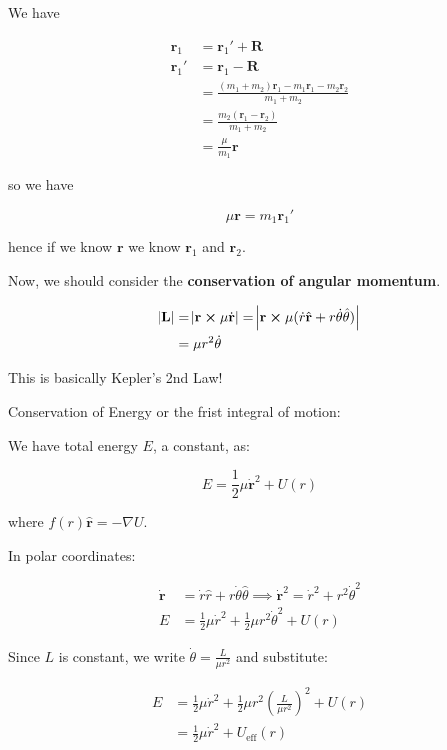 We have

\begin{align}
	\mathbf{r}_1 &= \mathbf{r}_1' + \mathbf{R}\\
	\textbf{r}_1' &= \textbf{r}_1 - \mathbf{R}\\
	&= \frac{(m_1 + m_2) \mathbf{r}_1 - m_1 \mathbf{r}_1 - m_2 \mathbf{r}_2}{m_1 + m_2}\\
	&= \frac{m_2 (\mathbf{r}_1 - \mathbf{r}_2)}{m_1 + m_2}\\
	&= \frac{\mu}{m_1} \mathbf{r}
\end{align}

so we have

\begin{equation}
	\mu \mathbf{r} = m_1 \mathbf{r}_1'
\end{equation}

hence if we know $\mathbf{r}$ we know $\mathbf{r}_1$ and $\mathbf{r}_2$.

Now, we should consider the \textbf{conservation of angular momentum}.

\begin{align}
	\abs{\mathbf{L}} &= \abs{\mathbf{r} \cross \mu \dot{\mathbf{r}}} = \abs{\mathbf{r} \cross \mu (\dot r \hat{\mathbf{r}} + r \dot\theta \hat{\mathbf{\theta}})}\\
	&= \mu r^2 \dot \theta
\end{align}

This is basically Kepler's 2nd Law!

Conservation of Energy or the frist integral of motion:

We have total energy $E$, a constant, as:

\begin{equation}
	E = \frac{1}{2} \mu \dot{\mathbf{r}}^2 + U(r)
\end{equation}

where $f(r) \hat{\mathbf{r}} = - \nabla U$.

In polar coordinates:

\begin{align}
	\dot{\mathbf{r}} &= \dot r \hat r + r \dot\theta \hat\theta \implies \dot{\mathbf{r}}^2 = \dot r^2 + r^2 \dot \theta^2\\
	E &= \frac{1}{2} \mu \dot r^2 + \frac{1}{2}\mu r^2 \dot\theta^2 + U(r)
\end{align}

Since $L$ is constant, we write $\dot \theta = \frac{L}{\mu r^2}$ and substitute:

\begin{align}
	E &= \frac{1}{2} \mu \dot r^2 + \frac{1}{2}\mu r^2 \left(\frac{L}{\mu r^2}\right)^2 + U(r)\\
	&= \frac{1}{2} \mu \dot r^2 + U_\mathrm{eff}(r)
\end{align}


